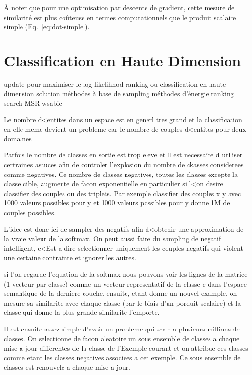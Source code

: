 À noter que pour une optimisation par descente de gradient, cette mesure de
similarité est plus coûteuse en termes computationnels que le produit scalaire
simple (Eq.~\ref{eq:dot-simple}).

\section{Classification en Haute Dimension}

update pour maximiser le log likelihhod
ranking ou classification en haute dimension
solution méthodes à base de sampling
méthodes d'énergie ranking
search MSR
wsabie

Le nombre d<entites dans un espace est en generl tres grand et la
classification en elle-meme devient un probleme car le nombre de couples
d<entites pour deux domaines

Parfois le nombre de classes en sortie est trop eleve et il est necessaire d
utiliser certraines astuces afin de controler l'explosion du nombre de ckasses
considerees comme negatives. Ce nombre de classes negatives, toutes les classes
excepte la classe cible, augmente de facon exponentielle en particulier si l<on
desire classifier des couples ou des triplets. Par exemple classifier des
couples x y avec 1000 valeurs possibles pour y et 1000 valeurs possibles pour y
donne 1M de couples possibles.

L'idee est donc ici de sampler des negatifs afin d<obtenir une approximation de
la vraie valeur de la softmax.  On peut aussi faire du sampling de negatif
intelligent, c<Est a dire selectionner uniquement les couples negatifs qui
violent une certaine contrainte et ignorer les autres.

si l'on regarde l'equation de la softmax
nous pouvons voir les lignes de la matrice (1 vecteur par classe) comme un vecteur representatif de la classe c dans l'espace semantique de la derniere couche.
ensuite, etant donne un nouvel example, on mesure sa similarite avec chaque classe (par le biais d'un porduit scalaire) et la classe qui donne la plus grande similarite l'emporte.

Il est ensuite assez simple d'avoir un probleme qui scale a plusieurs millions de classes. On selectionne de facon aleatoire un sous ensemble de classes a chaque mise a jour differentes de la classe de l'Exemple courant et on attribue ces classes comme etant les classes negatives associees a cet exemple. Ce sous ensemble de classes est renouvele a chaque mise a jour.



